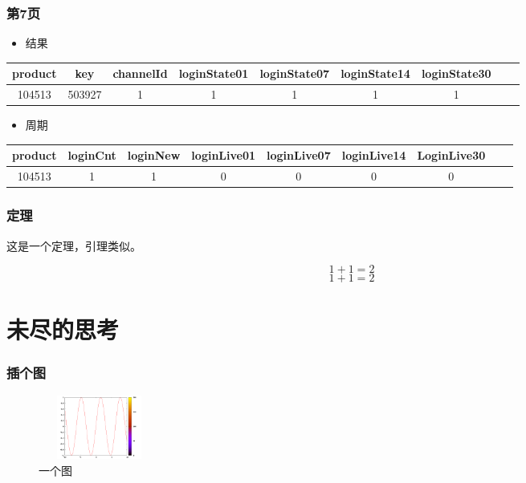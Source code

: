 \documentclass[notheorems,mathserif,table,Singapore]{beamer}
\begin{document}
\begin{frame}
\frametitle{第7页}

\begin{itemize}
\item 结果
\end{itemize}
\begin{table}\tiny
\begin{tabular}{c c c c c c c c c}
\hline
product & key & channelId &  loginState01 & loginState07 & loginState14 & loginState30\\
\hline
104513 & 503927 & 1   &       1      &     1        &    1  &    1 \\ 
\hline
\end{tabular}
\end{table}
\begin{itemize}
\item 周期
\end{itemize}
\begin{table}\tiny
\begin{tabular}{c c c c c c c c c}
\hline
product  & loginCnt &  loginNew & loginLive01 & loginLive07 & loginLive14 &LoginLive30\\
\hline
104513   & 1         &        1  &     0       &    0        &    0        & 0    \\ 
\hline
\end{tabular}
\end{table}
\end{frame}

\begin{frame}\frametitle{定理}
\begin{lemma}[1]
这是一个定理，引理类似。
\end{lemma}
\pause                       %
\begin{displaymath}             %
1+1=2
\end{displaymath}
\begin{equation}
1+1=2
\end{equation}
\end{frame}
\section*{未尽的思考}
\begin{frame}\frametitle{插个图}
\begin{figure}[!htbp]
\centering
\includegraphics[width=4.00cm,height=2.10cm]{test}
\caption{一个图}
\end{figure}
\end{frame}
\end{document}
